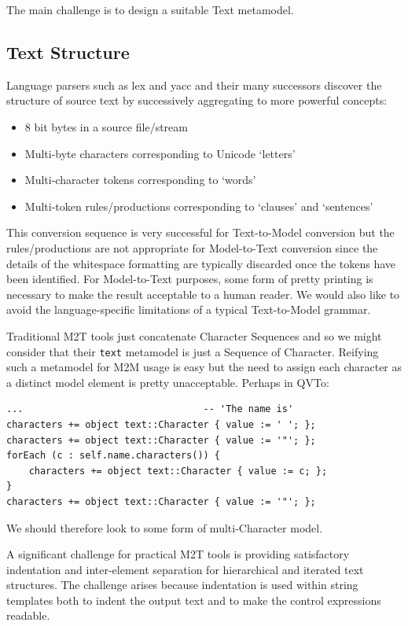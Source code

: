 \documentclass{llncs}
\begin{document}
The main challenge is to design a suitable Text metamodel.

\subsection{Text Structure}\label{Text Structure}

Language parsers such as lex and yacc \cite{DragonBook} and their many successors discover the structure of source text by successively aggregating to more powerful concepts:

\begin{itemize}
	\item 8 bit bytes in a source file/stream
	\item Multi-byte characters corresponding to Unicode `letters'
	\item Multi-character tokens corresponding to `words'
	\item Multi-token rules/productions corresponding to `clauses' and `sentences'
\end{itemize}

This conversion sequence is very successful for Text-to-Model conversion but the rules/productions are not appropriate for Model-to-Text conversion since the details of the whitespace formatting are typically discarded once the tokens have been identified. For Model-to-Text purposes, some form of pretty printing is necessary to make the result acceptable to a human reader. We would also like to avoid the language-specific limitations of a typical Text-to-Model grammar.

Traditional M2T tools just concatenate Character Sequences and so we might consider that their \verb$text$ metamodel is just a Sequence of Character. Reifying such a metamodel for M2M usage is easy but the need to assign each character as a distinct model element is pretty unacceptable. Perhaps in QVTo:

\begin{verbatim}
...                                -- 'The name is'
characters += object text::Character { value := ' '; };
characters += object text::Character { value := '"'; };
forEach (c : self.name.characters()) {
    characters += object text::Character { value := c; };
}
characters += object text::Character { value := '"'; };
\end{verbatim}

We should therefore look to some form of multi-Character model.

A significant challenge for practical M2T tools is providing satisfactory indentation and inter-element separation for hierarchical and iterated text structures. The challenge arises because indentation is used within string templates both to indent the output text and to make the control expressions readable. 
\end{document}
